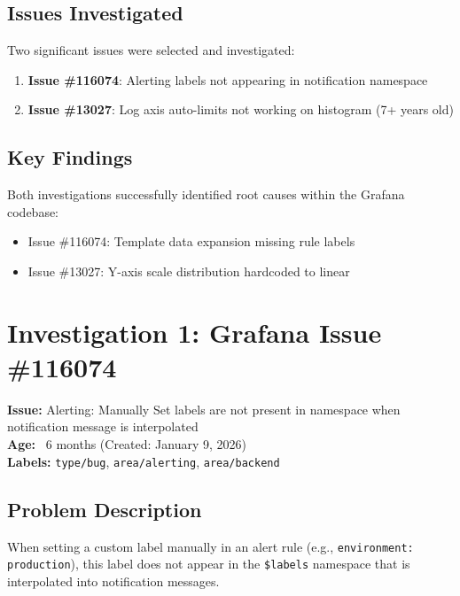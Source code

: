 \documentclass[12pt,a4paper,oneside]{article}
\begin{document}
\subsection{Issues Investigated}

Two significant issues were selected and investigated:

\begin{enumerate}
    \item \textbf{Issue \#116074}: Alerting labels not appearing in notification namespace
    \item \textbf{Issue \#13027}: Log axis auto-limits not working on histogram (7+ years old)
\end{enumerate}

\subsection{Key Findings}

Both investigations successfully identified root causes within the Grafana codebase:

\begin{itemize}
    \item Issue \#116074: Template data expansion missing rule labels
    \item Issue \#13027: Y-axis scale distribution hardcoded to linear
\end{itemize}

\newpage

\section{Investigation 1: Grafana Issue \#116074}
\textbf{Issue:} Alerting: Manually Set labels are not present in namespace when notification message is interpolated\\
\textbf{Age:} ~6 months (Created: January 9, 2026)\\
\textbf{Labels:} \texttt{type/bug}, \texttt{area/alerting}, \texttt{area/backend}

\subsection{Problem Description}

When setting a custom label manually in an alert rule (e.g., \texttt{environment: production}), this label does not appear in the \texttt{\$labels} namespace that is interpolated into notification messages.
\end{document}
